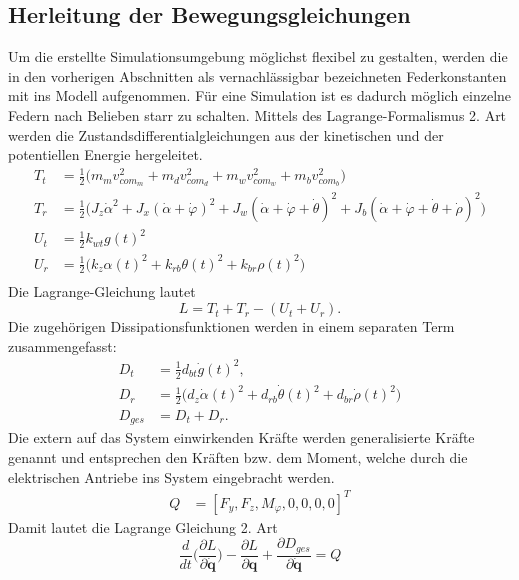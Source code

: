 \documentclass[10pt,a4paper]{iace.report}
\begin{document}
		\subsection{Herleitung der Bewegungsgleichungen}
			Um die erstellte Simulationsumgebung möglichst flexibel zu gestalten, werden die in den vorherigen Abschnitten als vernachlässigbar bezeichneten Federkonstanten mit ins Modell aufgenommen. Für eine Simulation ist es dadurch möglich einzelne Federn nach Belieben starr zu schalten. Mittels des Lagrange-Formalismus 2. Art werden die Zustandsdifferentialgleichungen aus der kinetischen und der potentiellen Energie hergeleitet. 
			\begin{align*}
			T_{t}&= \frac{1}{2}\bigg(m_{m}v_{com_{m}}^{2} +m_{d}v_{com_{d}}^{2}+m_{w}v_{com_{w}}^{2}+m_{b}v_{com_{b}}^{2}\bigg)\\  
			T_{r}&= \frac{1}{2}\bigg(J_{z}\dot{\alpha}^{2}+J_{x}(\dot{\alpha}+\dot{\varphi})^{2} +J_{w}(\dot{\alpha}+\dot{\varphi}+\dot{\theta})^{2} +J_{b}(\dot{\alpha}+\dot{\varphi}+\dot{\theta}+ \dot{\rho})^{2}\bigg)\\   
			U_{t} &= \frac{1}{2}k_{wt}g(t)^{2}\\
			U_{r} &= \frac{1}{2}\bigg(k_{z}\alpha(t)^{2}+ k_{rb}\theta(t)^{2}+k_{br}\rho(t)^2\bigg)\\
			\end{align*}
			Die Lagrange-Gleichung lautet
			\begin{equation*}
			L = T_{t}+T_{r} - (U_{t}+U_{r}).
			\end{equation*}
			Die zugehörigen Dissipationsfunktionen werden in einem separaten Term zusammengefasst:
			\begin{align*}
			D_{t} &= \frac{1}{2}d_{bt}\dot{g}(t)^{2}, \\
			D_{r} &= \frac{1}{2}\bigg(d_{z}\dot{\alpha}(t)^{2} + d_{rb}\dot{\theta}(t)^{2} + d_{br}\dot{\rho}(t)^{2}\bigg)\\
			D_{ges} &= D_{t} + D_{r}.
			\end{align*}
			Die extern auf das System einwirkenden Kräfte werden generalisierte Kräfte genannt und entsprechen den Kräften bzw. dem Moment, welche durch die elektrischen Antriebe ins System eingebracht werden.
			\begin{align*}
			Q & = [F_{y}, F_{z}, M_{\varphi},0 , 0, 0, 0]^{T}
			\end{align*}
			Damit lautet die Lagrange Gleichung 2. Art
			\[\frac{d}{dt}\bigg(\frac{\partial L}{\partial \dot{\bm{q}}} \bigg) -\frac{\partial L}{\partial \bm{q}} + \frac{\partial D_{ges}}{\partial \dot{\bm{q}}} = Q \]
\end{document}

